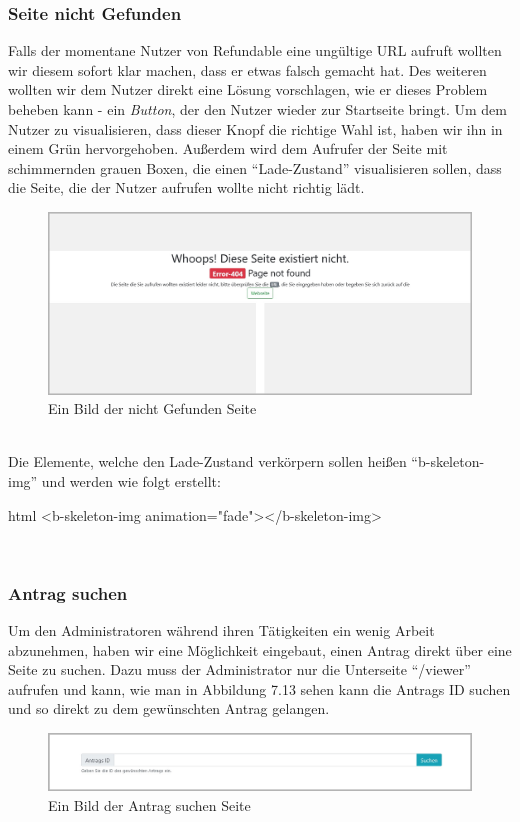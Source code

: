 \subsubsection{Seite nicht Gefunden}
Falls der momentane Nutzer von Refundable eine ungültige URL aufruft wollten wir diesem sofort klar machen, dass er etwas falsch gemacht hat. Des weiteren wollten wir dem Nutzer direkt eine Lösung vorschlagen, wie er dieses Problem beheben kann - ein \textit{Button}, der den Nutzer wieder zur Startseite bringt. Um dem Nutzer zu visualisieren, dass dieser Knopf die richtige Wahl ist, haben wir ihn in einem Grün hervorgehoben. Außerdem wird dem Aufrufer der Seite mit schimmernden grauen Boxen, die einen \enquote{Lade-Zustand} visualisieren sollen, dass die Seite, die der Nutzer aufrufen wollte nicht richtig lädt.
\begin{figure}[H]
	\centering
	\includegraphics[width=1\linewidth]{images/website/notfound}
	\caption[Neuer Schulantrag]{Ein Bild der nicht Gefunden Seite}
	\label{fig:notfoundsite}
\end{figure}
~\\
Die Elemente, welche den Lade-Zustand verkörpern sollen heißen \enquote{b-skeleton-img} und werden wie folgt erstellt:
\begin{code}{html}
	<b-skeleton-img animation="fade"></b-skeleton-img>
\end{code}
	\label{list:codeskeleton} ~\\

\newpage
\subsubsection{Antrag suchen}
Um den Administratoren während ihren Tätigkeiten ein wenig Arbeit abzunehmen, haben wir eine Möglichkeit eingebaut, einen Antrag direkt über eine Seite zu suchen. Dazu muss der Administrator nur die Unterseite \enquote{/viewer} aufrufen und kann, wie man in Abbildung 7.13 sehen kann die Antrags ID suchen und so direkt zu dem gewünschten Antrag gelangen.
\begin{figure}[H]
	\centering
	\includegraphics[width=1\linewidth]{images/website/search}
	\caption[Neuer Schulantrag]{Ein Bild der Antrag suchen Seite}
	\label{fig:searchsite}
\end{figure}
~\\

